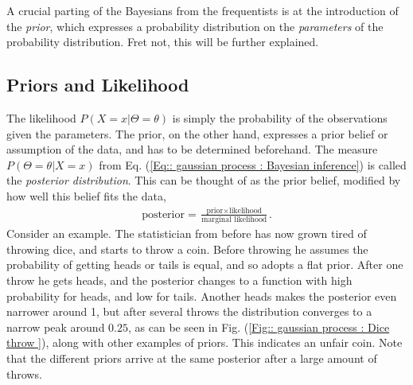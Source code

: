 \documentclass[twoside,english]{uiofysmaster}
\begin{document}
A crucial parting of the Bayesians from the frequentists is at the introduction of the \textit{prior}, which expresses a probability distribution on the \textit{parameters} of the probability distribution. Fret not, this will be further explained.

\subsection{Priors and Likelihood}

The likelihood $P(X = x |\Theta = \theta)$ is simply the probability of the observations given the parameters. The prior, on the other hand, expresses a prior belief or assumption of the data, and has to be determined beforehand. The measure $P(\Theta = \theta | X = x)$ from Eq. (\ref{Eq:: gaussian process : Bayesian inference}) is called the \textit{posterior distribution}. This can be thought of as the prior belief, modified by how well this belief fits the data,
\begin{align*}
\text{posterior} = \frac{\text{prior} \times \text{likelihood}}{\text{marginal likelihood}}.
\end{align*}
Consider an example. The statistician from before has now grown tired of throwing dice, and starts to throw a coin. Before throwing he assumes the probability of getting heads or tails is equal, and so adopts a flat prior. After one throw he gets heads, and the posterior changes to a function with high probability for heads, and low for tails. Another heads makes the posterior even narrower around 1, but after several throws the distribution converges to a narrow peak around $0.25$, as can be seen in Fig. (\ref{Fig:: gaussian process : Dice throw }), along with other examples of priors. This indicates an unfair coin. Note that the different priors arrive at the same posterior after a large amount of throws.
\end{document}
